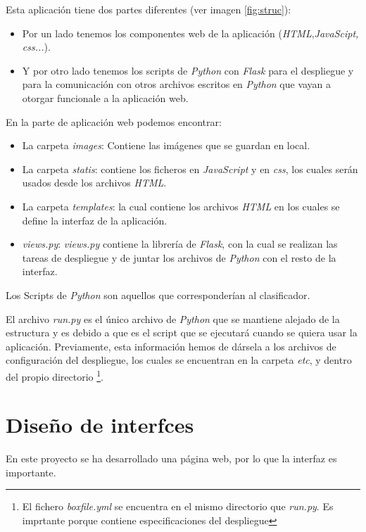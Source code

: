 Esta aplicación tiene dos partes diferentes (ver imagen \ref{fig:struc}):

\begin{itemize}
	\item Por un lado tenemos los componentes web de la aplicación (\textit{HTML},\textit{JavaScipt, css...}).
	\item Y por otro lado tenemos los scripts de \textit{Python} con \textit{Flask} para el despliegue y para la comunicación con otros archivos escritos en \textit{Python} que vayan a otorgar funcionale a la aplicación web.
\end{itemize}

En la parte de aplicación web podemos encontrar:
\begin{itemize}
	\item La carpeta \textit{images}: Contiene las imágenes que se guardan en local.
	\item La carpeta \textit{statis}: contiene los ficheros en \textit{JavaScript} y en \textit{css}, los cuales serán usados desde los archivos \textit{HTML}.
	\item La carpeta \textit{templates}: la cual contiene los archivos \textit{HTML} en los cuales se define la interfaz de la aplicación.
	\item \textit{views.py}: \textit{views.py} contiene la librería de \textit{Flask}, con la cual se realizan las tareas de despliegue y de juntar los archivos de \textit{Python} con el resto de la interfaz.
\end{itemize}
 
 Los Scripts de \textit{Python} son aquellos que corresponderían al clasificador.
 
 El archivo \textit{run.py} es el único archivo de \textit{Python} que se mantiene alejado de la estructura y es debido a que es el script que se ejecutará cuando se quiera usar la aplicación. Previamente, esta información hemos de dársela a los archivos de configuración del despliegue, los cuales se encuentran en la carpeta \textit{etc}, y dentro del propio directorio \footnote{El fichero \textit{boxfile.yml} se encuentra en el mismo directorio que \textit{run.py}. Es imprtante porque contiene especificaciones del despliegue}.
 
 \section{Diseño de interfces}
 En este proyecto se ha desarrollado una página web, por lo que la interfaz es importante.
 
